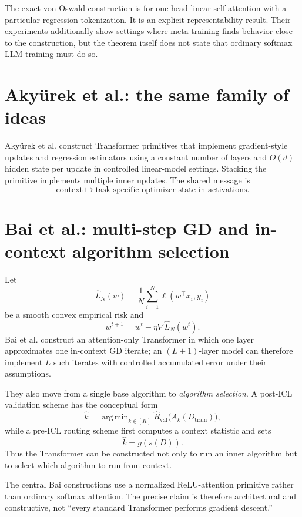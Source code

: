 \documentclass[11pt,a4paper,oneside,openany]{memoir}
\DeclareMathOperator*{\argmin}{arg\,min}
\theoremstyle{definition}
\begin{document}
\begin{paperbox}
The exact von Oswald construction is for one-head linear self-attention with a particular regression tokenization.  It is an explicit representability result.  Their experiments additionally show settings where meta-training finds behavior close to the construction, but the theorem itself does not state that ordinary softmax LLM training must do so.
\end{paperbox}

\section{Aky\"urek et al.: the same family of ideas}
Aky\"urek et al. construct Transformer primitives that implement gradient-style updates and regression estimators using a constant number of layers and $O(d)$ hidden state per update in controlled linear-model settings.  Stacking the primitive implements multiple inner updates.  The shared message is
\[
\text{context}\longmapsto\text{task-specific optimizer state in activations}.
\]

\section{Bai et al.: multi-step GD and in-context algorithm selection}
Let
\[
\widehat L_N(w)=\frac1N\sum_{i=1}^N\ell(w^\top x_i,y_i)
\]
be a smooth convex empirical risk and
\[
w^{t+1}=w^t-\eta\nabla\widehat L_N(w^t).
\]
Bai et al. construct an attention-only Transformer in which one layer approximates one in-context GD iterate; an $(L+1)$-layer model can therefore implement $L$ such iterates with controlled accumulated error under their assumptions.

They also move from a single base algorithm to \emph{algorithm selection}.  A post-ICL validation scheme has the conceptual form
\[
\widehat k
=\argmin_{k\in[K]}
\widehat R_{\mathrm{val}}\bigl(A_k(D_{\mathrm{train}})\bigr),
\]
while a pre-ICL routing scheme first computes a context statistic and sets
\[
\widehat k=g(s(D)).
\]
Thus the Transformer can be constructed not only to run an inner algorithm but to select which algorithm to run from context.

\begin{warningbox}
The central Bai constructions use a normalized ReLU-attention primitive rather than ordinary softmax attention.  The precise claim is therefore architectural and constructive, not ``every standard Transformer performs gradient descent.''
\end{warningbox}
\end{document}
